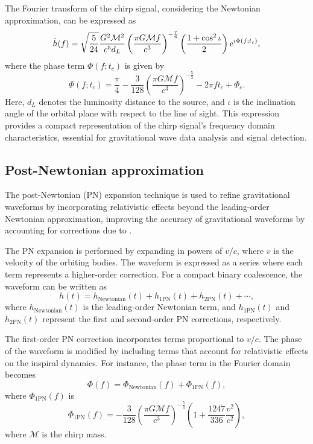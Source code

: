 The Fourier transform of the chirp signal, considering the Newtonian approximation, can be expressed as
%
\begin{equation}
    \Tilde{h}(f) = \sqrt{\frac{5}{24}} \frac{G^2 \mathcal{M}^2}{c^5 d_L} \left(\frac{\pi G \mathcal{M} f}{c^3}\right)^{-\frac{7}{6}} \left(\frac{1 + \cos^2 \iota}{2}\right) {\rm e}^{i \Phi(f; t_c)},
\end{equation}
%
where the phase term \( \Phi(f; t_c) \) is given by
%
\begin{equation}
    \Phi(f; t_c) = \frac{\pi}{4} - \frac{3}{128} \left(\frac{\pi G \mathcal{M} f}{c^3}\right)^{-\frac{5}{3}} - 2\pi f t_c + \Phi_c.
\end{equation}
%
Here, \( d_L \) denotes the luminosity distance to the source, and \( \iota \) is the inclination angle of the orbital plane with respect to the line of sight. This expression provides a compact representation of the chirp signal's frequency domain characteristics, essential for gravitational wave data analysis and signal detection.

\subsection{\label{1:sec:post_newtonian_treatment}Post-Newtonian approximation}

The post-Newtonian (PN) expansion technique is used to refine gravitational waveforms by incorporating relativistic effects beyond the leading-order Newtonian approximation, improving the accuracy of gravitational waveforms by accounting for corrections due to \GR.

The PN expansion is performed by expanding in powers of \( v/c \), where \( v \) is the velocity of the orbiting bodies. The waveform is expressed as a series where each term represents a higher-order correction. For a compact binary coalescence, the waveform can be written as
%
\begin{equation}
    h(t) = h_{\text{Newtonian}}(t) + h_{\text{1PN}}(t) + h_{\text{2PN}}(t) + \cdots,
\end{equation}
%
where \( h_{\text{Newtonian}}(t) \) is the leading-order Newtonian term, and \( h_{\text{1PN}}(t) \) and \( h_{\text{2PN}}(t) \) represent the first and second-order PN corrections, respectively.

The first-order PN correction incorporates terms proportional to \( v/c \). The phase of the waveform is modified by including terms that account for relativistic effects on the inspiral dynamics. For instance, the phase term in the Fourier domain becomes
%
\begin{equation}
    \Phi(f) = \Phi_{\text{Newtonian}}(f) + \Phi_{\text{1PN}}(f),
\end{equation}
%
where \( \Phi_{\text{1PN}}(f) \) is
%
\begin{equation}
    \Phi_{\text{1PN}}(f) = -\frac{3}{128} \left(\frac{\pi G \mathcal{M} f}{c^3}\right)^{-\frac{5}{3}} \left( 1 + \frac{1247}{336} \frac{v^2}{c^2} \right),
\end{equation}
%
where \( \mathcal{M} \) is the chirp mass.

